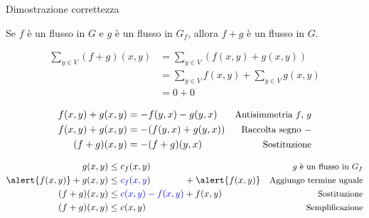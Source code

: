 \begin{frame}{Dimostrazione correttezza}

\vspace{-9pt}
\begin{myboxtitle}[Lemma]
Se $f$ è un flusso in $G$ e $g$ è un flusso in $G_f$, allora
$f+g$ è un flusso in $G$.
\end{myboxtitle}

\begin{overprint}
\begin{myboxtitle}
\small
\begin{align*}
  \sum_{y \in V} (f+g)(x,y) &= \sum_{y \in V} (f(x,y) + g(x,y)) \\
  &= \sum_{y \in V} f(x,y) + \sum_{y \in V} g(x,y) \\
   &= 0 + 0
\end{align*}
\end{myboxtitle}
\begin{myboxtitle}
\small
\begin{align*}
f(x,y)+g(x,y) &= -f(y,x)-g(y,x) & \textrm{\small Antisimmetria $f$, $g$} \\
f(x,y)+g(x,y) &= -(f(y,x) + g(y,x)) & \textrm{\small Raccolta segno $-$} \\
(f+g)(x,y) &= -(f+g)(y,x) & \textrm{\small Sostituzione} 
\end{align*}
\end{myboxtitle}
\begin{myboxtitle}
\small
\begin{align*}
g(x,y) &\leq c_f(x,y) & \textrm{\small $g$ è un flusso in $G_f$} \\
\alert{f(x,y)} + g(x,y) &\leq  \textcolor{blue}{c_f(x,y}) \qquad\quad~~ + \alert{f(x,y)} & \textrm{\small Aggiungo termine uguale}\\
(f+g)(x,y) &\leq \textcolor{blue}{c(x,y)-f(x,y)} + f(x,y) & \textrm{\small Sostituzione}\\
(f+g)(x,y) &\leq c(x,y) & \textrm{\small Semplificazione}
\end{align*}
\end{myboxtitle}


\end{overprint}
\end{frame}
